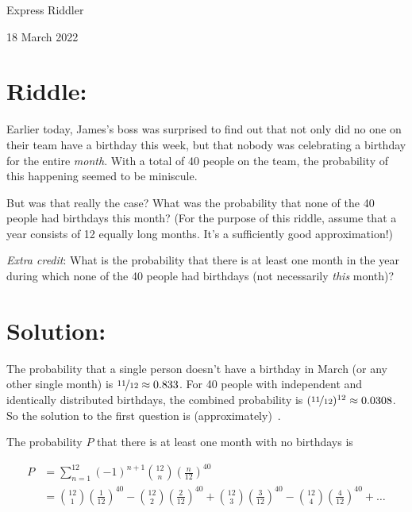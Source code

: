 \documentclass{article}
\begin{document}
\pagestyle{empty} %

\begin{center}
{\LARGE Express Riddler}

\vspace{0.15in}

{\Large 18 March 2022}
\end{center}


\section*{Riddle:}

Earlier today, James's boss was surprised to find out that not only did no one on their team have a birthday this week, but that nobody was celebrating a birthday for the entire \textit{month}.
With a total of 40 people on the team, the probability of this happening seemed to be miniscule.

But was that really the case?
What was the probability that none of the 40 people had birthdays this month?
(For the purpose of this riddle, assume that a year consists of 12 equally long months.
It's a sufficiently good approximation!)

\textit{Extra credit}: What is the probability that there is at least one month in the year during which none of the 40 people had birthdays (not necessarily \textit{this} month)?


\section*{Solution:}

The probability that a single person doesn't have a birthday in March (or any other single month) is $\nicefrac{11}{12}\approx0.833$.
For 40 people with independent and identically distributed birthdays, the combined probability is $(\nicefrac{11}{12})^{12}\approx0.0308$.
So the solution to the first question is (approximately) \,.

The probability $P$ that there is at least one month with no birthdays is

\begin{align*}
P &= \sum_{n=1}^{12}(-1)^{n+1}\binom{12}{n}\left(\frac{n}{12}\right)^{40} \\
  &= \binom{12}{1}\left(\frac{1}{12}\right)^{40} - \binom{12}{2}\left(\frac{2}{12}\right)^{40} + \binom{12}{3}\left(\frac{3}{12}\right)^{40} - \binom{12}{4}\left(\frac{4}{12}\right)^{40} +\dots
\end{align*}
\end{document}

